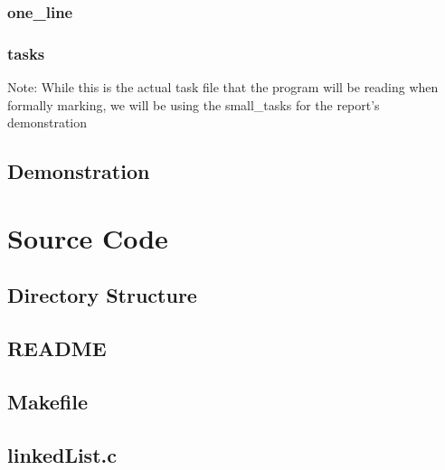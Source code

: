 \documentclass[a4paper, 12pt, titlepage]{article}
\begin{document}
\subsubsection{one\_line}


\subsubsection{tasks}
\begin{multicols}{4}

\end{multicols}

Note: While this is the actual task file that the program will be reading when
formally marking, we will be using the small\_tasks for the report's
demonstration
\newpage

\subsection{Demonstration}

\newpage

\section{Source Code}

\subsection{Directory Structure}

\newpage

\subsection{README}

\newpage

\subsection{Makefile}

\newpage

\subsection{linkedList.c}

\newpage
\end{document}
